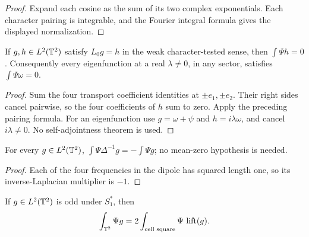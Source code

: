 \begin{proof}
\leanok
Expand each cosine as the sum of its two complex exponentials. Each
character pairing is integrable, and the Fourier integral formula gives
the displayed normalization.
\end{proof}

\begin{lemma}
\label{lem:dipole-transport-orthogonality}
\leanok
If $g,h\in L^2(\mathbb{T}^2)$ satisfy $L_0g=h$ in the weak character-tested sense,
then $\int\Psi h=0$. Consequently every eigenfunction at a real
$\lambda\ne0$, in any sector, satisfies $\int\Psi\omega=0$.
\end{lemma}

\begin{proof}
\leanok
Sum the four transport coefficient identities at $\pm e_1,\pm e_2$.
Their right sides cancel pairwise, so the four coefficients of $h$ sum
to zero. Apply the preceding pairing formula. For an eigenfunction use
$g=\omega+\psi$ and $h=i\lambda\omega$, and cancel $i\lambda\ne0$.
No self-adjointness theorem is used.
\end{proof}

\begin{lemma}
\label{lem:dipole-invlap-pairing}
\leanok
For every $g\in L^2(\mathbb{T}^2)$,
$\int\Psi\Delta^{-1}g=-\int\Psi g$; no mean-zero hypothesis is needed.
\end{lemma}

\begin{proof}
\leanok
Each of the four frequencies in the dipole has squared length one, so
its inverse-Laplacian multiplier is $-1$.
\end{proof}

\begin{lemma}
\label{lem:odd-dipole-cell-pairing}
\leanok
If $g\in L^2(\mathbb{T}^2)$ is odd under $S_1^*$, then
\[
 \int_{\mathbb{T}^2}\Psi g=2\int_{\text{cell square}}\Psi\,\operatorname{lift}(g).
\]
\end{lemma}

